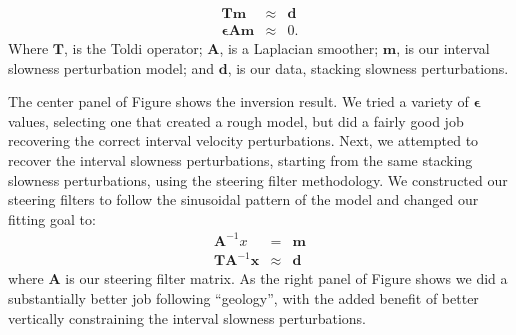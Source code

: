 \begin{eqnarray}
{\mathbf T} {\mathbf m} &\approx& {\mathbf d} \\
{\mathbf \epsilon} {\mathbf A} {\mathbf m} &\approx&  0 .
\end{eqnarray}
Where ${\mathbf T}$, is the Toldi operator; ${\mathbf A}$, is a Laplacian smoother; 
${\mathbf m}$, is our interval slowness perturbation model; and ${\mathbf d}$, is
our data, stacking slowness perturbations.
\par
The center panel of Figure  shows the inversion result.  
We tried a variety of ${\mathbf \epsilon}$ values, selecting one that 
created a rough
model, but did a fairly good job recovering the correct interval velocity
perturbations.
Next, we attempted to recover the interval slowness perturbations, starting
from the same stacking slowness perturbations, using the
steering filter
methodology.  
We constructed our steering filters to follow the sinusoidal pattern of the 
model and changed our fitting goal to:
\begin{eqnarray}
{\mathbf A^{-1} x} &=& {\mathbf m} \\
{\mathbf T} {\mathbf A}^{-1} {\mathbf x} &\approx& {\mathbf d} 
\end{eqnarray}
where ${\mathbf A}$ is our steering filter matrix.  As the right panel of 
Figure  shows we did a substantially better job 
following ``geology'', with the added benefit of better vertically
constraining  the interval slowness perturbations. 



